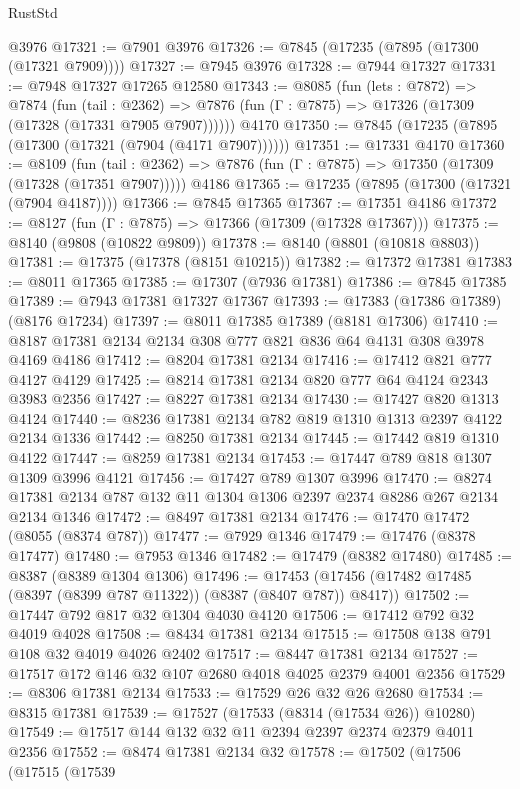 \begin{lexlean}{RustStd}
\begin{coremodule}
    @3976
@17321 := @7901 @3976
@17326 := @7845 (@17235 (@7895 (@17300 (@17321 @7909))))
@17327 := @7945 @3976
@17328 := @7944 @17327
@17331 := @7948 @17327 @17265 @12580
@17343 := @8085
    (fun (lets : @7872) =>
    @7874
      (fun (tail : @2362) =>
      @7876 (fun (Γ : @7875) => @17326 (@17309 (@17328 (@17331 @7905 @7907))))))
    @4170
@17350 := @7845 (@17235 (@7895 (@17300 (@17321 (@7904 (@4171 @7907))))))
@17351 := @17331 @4170
@17360 := @8109
    (fun (tail : @2362) => @7876 (fun (Γ : @7875) => @17350 (@17309 (@17328 (@17351 @7907)))))
    @4186
@17365 := @17235 (@7895 (@17300 (@17321 (@7904 @4187))))
@17366 := @7845 @17365
@17367 := @17351 @4186
@17372 := @8127 (fun (Γ : @7875) => @17366 (@17309 (@17328 @17367)))
@17375 := @8140 (@9808 (@10822 @9809))
@17378 := @8140 (@8801 (@10818 @8803))
@17381 := @17375 (@17378 (@8151 @10215))
@17382 := @17372 @17381
@17383 := @8011 @17365
@17385 := @17307 (@7936 @17381)
@17386 := @7845 @17385
@17389 := @7943 @17381 @17327 @17367
@17393 := @17383 (@17386 @17389) (@8176 @17234)
@17397 := @8011 @17385 @17389 (@8181 @17306)
@17410 := @8187 @17381 @2134 @2134 @308 @777 @821 @836 @64 @4131 @308 @3978 @4169 @4186
@17412 := @8204 @17381 @2134
@17416 := @17412 @821 @777 @4127 @4129
@17425 := @8214 @17381 @2134 @820 @777 @64 @4124 @2343 @3983 @2356
@17427 := @8227 @17381 @2134
@17430 := @17427 @820 @1313 @4124
@17440 := @8236 @17381 @2134 @782 @819 @1310 @1313 @2397 @4122 @2134 @1336
@17442 := @8250 @17381 @2134
@17445 := @17442 @819 @1310 @4122
@17447 := @8259 @17381 @2134
@17453 := @17447 @789 @818 @1307 @1309 @3996 @4121
@17456 := @17427 @789 @1307 @3996
@17470 := @8274 @17381 @2134 @787 @132 @11 @1304 @1306 @2397 @2374 @8286 @267 @2134 @2134 @1346
@17472 := @8497 @17381 @2134
@17476 := @17470 @17472 (@8055 (@8374 @787))
@17477 := @7929 @1346
@17479 := @17476 (@8378 @17477)
@17480 := @7953 @1346
@17482 := @17479 (@8382 @17480)
@17485 := @8387 (@8389 @1304 @1306)
@17496 := @17453 (@17456 (@17482 @17485 (@8397 (@8399 @787 @11322)) (@8387 (@8407 @787)) @8417))
@17502 := @17447 @792 @817 @32 @1304 @4030 @4120
@17506 := @17412 @792 @32 @4019 @4028
@17508 := @8434 @17381 @2134
@17515 := @17508 @138 @791 @108 @32 @4019 @4026 @2402
@17517 := @8447 @17381 @2134
@17527 := @17517 @172 @146 @32 @107 @2680 @4018 @4025 @2379 @4001 @2356
@17529 := @8306 @17381 @2134
@17533 := @17529 @26 @32 @26 @2680
@17534 := @8315 @17381
@17539 := @17527 (@17533 (@8314 (@17534 @26)) @10280)
@17549 := @17517 @144 @132 @32 @11 @2394 @2397 @2374 @2379 @4011 @2356
@17552 := @8474 @17381 @2134 @32
@17578 := @17502
    (@17506
      (@17515
        (@17539

\end{coremodule}
\end{lexlean}
